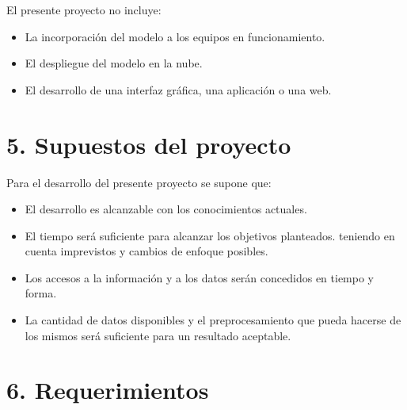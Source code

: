 \documentclass[
11pt, %
]{charter}
\begin{document}
El presente proyecto no incluye: 
\begin{itemize}
	\item La incorporación del modelo a los equipos en funcionamiento.
	\item El despliegue del modelo en la nube.
	\item El desarrollo de una interfaz gráfica, una aplicación o una web.
\end{itemize}



\section{5. Supuestos del proyecto}
\label{sec:supuestos}

Para el desarrollo del presente proyecto se supone que: 

\begin{itemize}
	\item El desarrollo es alcanzable con los conocimientos actuales.
	\item El tiempo será suficiente para alcanzar los objetivos planteados. teniendo en cuenta imprevistos y cambios de enfoque posibles.
	\item Los accesos a la información y a los datos serán concedidos en tiempo y forma.
	\item La cantidad de datos disponibles y el preprocesamiento que pueda hacerse de los mismos será suficiente para un resultado aceptable.
\end{itemize}


\section{6. Requerimientos}
\label{sec:requerimientos}
\end{document}
